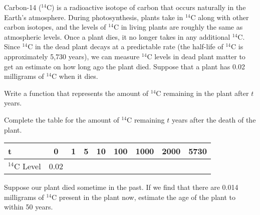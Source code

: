 \begin{pa} \label{PA:0.4}
	Carbon-14 ($^{14}$C) is a radioactive isotope of carbon that occurs naturally in the Earth's atmosphere.  During photosynthesis, plants take in $^{14}$C along with other carbon 	isotopes, and the levels of  $^{14}$C in living plants are roughly the same as atmospheric levels.  Once a plant dies, it no longer takes in any additional  $^{14}$C.  Since  $^{14}$C in the dead plant decays at a predictable rate (the half-life of $^{14}$C is approximately 5,730 years), we can measure  $^{14}$C levels in dead plant matter to get an estimate on how long ago the plant 	died.
	Suppose that a plant has 0.02 milligrams of $^{14}$C when it dies.
\ba
	\item Write a function that represents the amount of $^{14}$C remaining in the plant after $t$ years.
	\item Complete the table for the amount of $^{14}$C remaining $t$ years after the death of the plant.
        \begin{center}
            \begin{tabular}[h!]{| l |c|c|c|c|c|c|c|c|}
                \hline
                t & 0 & 1 & 5 & 10 & 100 & 1000 & 2000 & 5730 \\ \hline
                $^{14}$C Level & 0.02 & & & & & & & \\ \hline
            \end{tabular}
        \end{center}
	\item Suppose our plant died sometime in the past.  If we find that there are 0.014 milligrams of $^{14}$C present in the plant now, estimate the age of the plant to within 50 years.
        \ea
\end{pa} \afterpa
